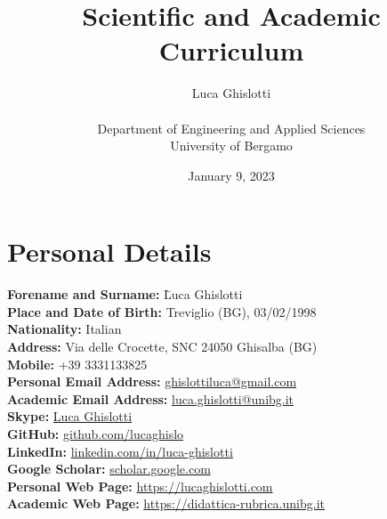 \documentclass[11pt]{article}
\title{\huge Scientific and Academic Curriculum%
}
\author{\vspace{0.2cm}\begin{huge}Luca Ghislotti\end{huge}\\\vspace{0.1cm} Department of Engineering and Applied Sciences\\University of Bergamo}
\date{January 9, 2023}
\begin{document}
\maketitle
\thispagestyle{fancy}

\onehalfspacing

\section*{Personal Details}
\begin{tabbing}
\hspace{8pt}\textbf{Forename and Surname: } \= Luca Ghislotti\\
\hspace{6pt}\textbf{Place and Date of Birth: } \> Treviglio (BG), 03/02/1998\\
\hspace{76.5pt}\textbf{Nationality: } \>Italian\\
\hspace{94pt}\textbf{Address: } Via delle Crocette, SNC 24050 Ghisalba (BG)\\
\hspace{100.5pt}\textbf{Mobile: } +39 3331133825\\
\hspace{6.5pt}\textbf{Personal Email Address: } \href{mailto:ghislottiluca@gmail.com}{ghislottiluca@gmail.com}\\
\hspace{0pt}\textbf{Academic Email Address: } \href{mailto:l.ghislotti@studenti.unibg.it}{luca.ghislotti@unibg.it}\\
\hspace{105pt}\textbf{Skype: } \href{https://join.skype.com/invite/m1XvXqe82tbO}{Luca Ghislotti}\\
\hspace{96.5pt}\textbf{GitHub: } \href{https://github.com/lucaghislo}{github.com/lucaghislo}\\
\hspace{89.5pt}\textbf{LinkedIn: } \href{https://www.linkedin.com/in/luca-ghislotti/}{linkedin.com/in/luca-ghislotti}\\
\hspace{55.5pt}\textbf{Google Scholar: } \href{https://scholar.google.com/citations?user=Xt1\_bCYAAAAJ}{scholar.google.com}\\
\hspace{31.5pt}\textbf{Personal Web Page: } \href{https://lucaghislotti.com}{https://lucaghislotti.com}\\
\hspace{25pt}\textbf{Academic Web Page: } \href{https://didattica-rubrica.unibg.it/ugov/person/135728}{https://didattica-rubrica.unibg.it} 
\end{tabbing}
\end{document}
